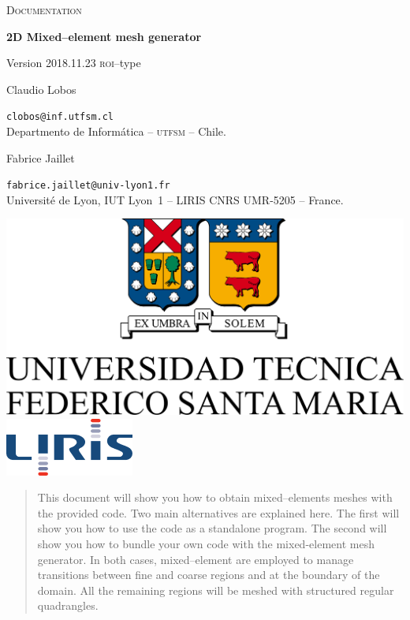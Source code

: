 \documentclass[10pt]{article}
\begin{document}
\begin{minipage}{0.7\textwidth}

{\LARGE \textsc{Documentation}}

{\Large \textbf{2D Mixed--element mesh generator}

{\large Version 2018.11.23 \textsc{roi}--type}}

{\large Claudio Lobos}

\small \texttt{clobos@inf.utfsm.cl}\\
\small Departmento de Inform\'atica -- \textsc{utfsm}  -- Chile.

{\large Fabrice Jaillet}

\small \texttt{fabrice.jaillet@univ-lyon1.fr}\\
\small Universit\'e de Lyon, IUT Lyon~1 -- LIRIS CNRS UMR-5205  -- France.
\end{minipage}
\hfill
\begin{minipage}{0.28\textwidth}
\includegraphics[width=\textwidth]{utfsm-all-oc.pdf}
\includegraphics[width=\textwidth]{logo_liris_160_0.png}
\end{minipage}

\vspace{0.5cm}

\begin{abstract}
This document will show you how to obtain mixed--elements meshes with the provided code. Two main alternatives are explained here. The first will show you how to use the code as a standalone program. The second will show you how to bundle your own code with the mixed-element mesh generator. In both cases, mixed--element are employed to manage transitions between fine and coarse regions and at the boundary of the domain. All the remaining regions will be meshed with structured regular quadrangles.
\end{abstract}
\end{document}
